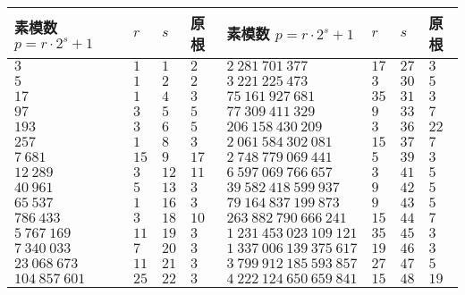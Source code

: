 \begin{tabular}{llll|llll}
    \hline
    素模数 \(p=r\cdot 2^s+1\)     & \(r\)   & \(s\)  & 原根     & 素模数 \(p=r\cdot 2^s+1\)        & \(r\)  & \(s\)  & 原根     \\
    \hline
    \(3\)                      & \(1\)   & \(1\)  & \(2\)  & \(2~281~701~377\)             & \(17\) & \(27\) & \(3\)  \\
    \(5\)                      & \(1\)   & \(2\)  & \(2\)  & \(3~221~225~473\)             & \(3\)  & \(30\) & \(5\)  \\
    \(17\)                     & \(1\)   & \(4\)  & \(3\)  & \(75~161~927~681\)            & \(35\) & \(31\) & \(3\)  \\
    \(97\)                     & \(3\)   & \(5\)  & \(5\)  & \(77~309~411~329\)            & \(9\)  & \(33\) & \(7\)  \\
    \(193\)                    & \(3\)   & \(6\)  & \(5\)  & \(206~158~430~209\)           & \(3\)  & \(36\) & \(22\) \\
    \(257\)                    & \(1\)   & \(8\)  & \(3\)  & \(2~061~584~302~081\)         & \(15\) & \(37\) & \(7\)  \\
    \(7~681\)                  & \(15\)  & \(9\)  & \(17\) & \(2~748~779~069~441\)         & \(5\)  & \(39\) & \(3\)  \\
    \(12~289\)                 & \(3\)   & \(12\) & \(11\) & \(6~597~069~766~657\)         & \(3\)  & \(41\) & \(5\)  \\
    \(40~961\)                 & \(5\)   & \(13\) & \(3\)  & \(39~582~418~599~937\)        & \(9\)  & \(42\) & \(5\)  \\
    \(65~537\)                 & \(1\)   & \(16\) & \(3\)  & \(79~164~837~199~873\)        & \(9\)  & \(43\) & \(5\)  \\
    \(786~433\)                & \(3\)   & \(18\) & \(10\) & \(263~882~790~666~241\)       & \(15\) & \(44\) & \(7\)  \\
    \(5~767~169\)              & \(11\)  & \(19\) & \(3\)  & \(1~231~453~023~109~121\)     & \(35\) & \(45\) & \(3\)  \\
    \(7~340~033\)              & \(7\)   & \(20\) & \(3\)  & \(1~337~006~139~375~617\)     & \(19\) & \(46\) & \(3\)  \\
    \(23~068~673\)             & \(11\)  & \(21\) & \(3\)  & \(3~799~912~185~593~857\)     & \(27\) & \(47\) & \(5\)  \\
    \(104~857~601\)            & \(25\)  & \(22\) & \(3\)  & \(4~222~124~650~659~841\)     & \(15\) & \(48\) & \(19\) \\

\end{tabular}
